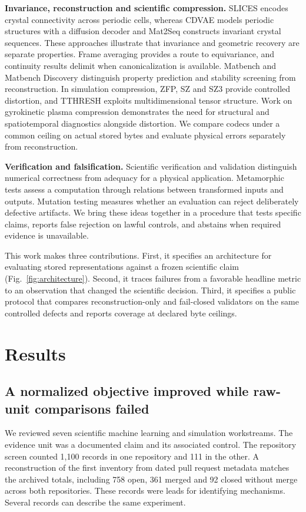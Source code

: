 \documentclass[10pt,a4paper,twocolumn]{article}
\begin{document}
\textbf{Invariance, reconstruction and scientific compression.}
SLICES encodes crystal connectivity across periodic cells, whereas CDVAE models periodic structures with a diffusion decoder and Mat2Seq constructs invariant crystal sequences.\cite{xiao,xie,yan} These approaches illustrate that invariance and geometric recovery are separate properties. Frame averaging provides a route to equivariance, and continuity results delimit when canonicalization is available.\cite{puny,dym} Matbench and Matbench Discovery distinguish property prediction and stability screening from reconstruction.\cite{dunn,riebesell} In simulation compression, ZFP, SZ and SZ3 provide controlled distortion, and TTHRESH exploits multidimensional tensor structure.\cite{lindstrom,sz2018,sz3,tthresh} Work on gyrokinetic plasma compression demonstrates the need for structural and spatiotemporal diagnostics alongside distortion.\cite{galletti} We compare codecs under a common ceiling on actual stored bytes and evaluate physical errors separately from reconstruction.

\textbf{Verification and falsification.}
Scientific verification and validation distinguish numerical correctness from adequacy for a physical application.\cite{yeo,asme} Metamorphic tests assess a computation through relations between transformed inputs and outputs. Mutation testing measures whether an evaluation can reject deliberately defective artifacts.\cite{lin,jia} We bring these ideas together in a procedure that tests specific claims, reports false rejection on lawful controls, and abstains when required evidence is unavailable.

This work makes three contributions. First, it specifies an architecture for evaluating stored representations against a frozen scientific claim (Fig.~\ref{fig:architecture}). Second, it traces failures from a favorable headline metric to an observation that changed the scientific decision. Third, it specifies a public protocol that compares reconstruction-only and fail-closed validators on the same controlled defects and reports coverage at declared byte ceilings.

\section{Results}

\subsection{A normalized objective improved while raw-unit comparisons failed}
We reviewed seven scientific machine learning and simulation workstreams. The evidence unit was a documented claim and its associated control. The repository screen counted 1,100 records in one repository and 111 in the other. A reconstruction of the first inventory from dated pull request metadata matches the archived totals, including 758 open, 361 merged and 92 closed without merge across both repositories. These records were leads for identifying mechanisms. Several records can describe the same experiment.
\end{document}
